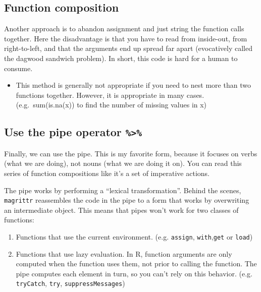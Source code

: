 \documentclass[]{book}
\providecommand{\tightlist}{%
  \setlength{\itemsep}{0pt}\setlength{\parskip}{0pt}}
\newenvironment{rmdblock}[1]
  {\begin{shaded*}
  \begin{itemize}
  \renewcommand{\labelitemi}{
    \raisebox{-.7\height}[0pt][0pt]{
      {\setkeys{Gin}{width=3em,keepaspectratio}\texttt{[image: images/\#1]}}
    }
  }
  \item
  }
  {
  \end{itemize}
  \end{shaded*}
  }
\newenvironment{rmdnote}
  {\begin{rmdblock}{note}}
  {\end{rmdblock}}
\theoremstyle{definition}
\theoremstyle{definition}
\theoremstyle{definition}
\theoremstyle{remark}
\begin{document}
\hypertarget{function-composition}{%
\subsection{Function composition}\label{function-composition}}

Another approach is to abandon assignment and just string the function
calls together. Here the disadvantage is that you have to read from
inside-out, from right-to-left, and that the arguments end up spread far
apart (evocatively called the dagwood sandwich problem). In short, this
code is hard for a human to consume.

\begin{rmdnote}
This method is generally not appropriate if you need to nest more than
two functions together. However, it is appropriate in many cases.
(e.g.~sum(is.na(x)) to find the number of missing values in x)
\end{rmdnote}

\hypertarget{use-the-pipe-operator}{%
\subsection{\texorpdfstring{Use the pipe operator
\texttt{\%\textgreater{}\%}}{Use the pipe operator \%\textgreater{}\%}}\label{use-the-pipe-operator}}

Finally, we can use the pipe. This is my favorite form, because it
focuses on verbs (what we are doing), not nouns (what we are doing it
on). You can read this series of function compositions like it's a set
of imperative actions.

The pipe works by performing a ``lexical transformation''. Behind the
scenes, \texttt{magrittr} reassembles the code in the pipe to a form
that works by overwriting an intermediate object. This means that pipes
won't work for two classes of functions:

\begin{enumerate}
\def\labelenumi{\arabic{enumi}.}
\tightlist
\item
  Functions that use the current environment. (e.g. \texttt{assign},
  \texttt{with},\texttt{get} or \texttt{load})
\item
  Functions that use lazy evaluation. In R, function arguments are only
  computed when the function uses them, not prior to calling the
  function. The pipe computes each element in turn, so you can't rely on
  this behavior. (e.g. \texttt{tryCatch}, \texttt{try},
  \texttt{suppressMessages})
\end{enumerate}
\end{document}
